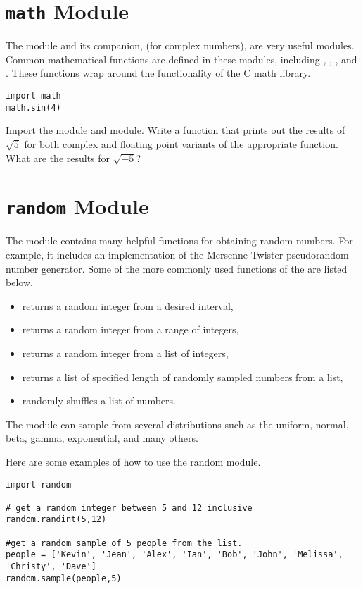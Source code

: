 \section*{\texttt{math} Module}
The  module and its companion,  (for complex numbers), are very useful modules.
Common mathematical functions are defined in these modules, including , , , and .
These functions wrap around the functionality of the C math library.
\begin{lstlisting}
import math
math.sin(4)
\end{lstlisting}

\begin{problem}
Import the  module and  module. Write a function that prints out the results of $\sqrt{5}$ for both complex and floating point variants of the appropriate function.  What are the results for $\sqrt{-5}$?
\end{problem}

\section*{\texttt{random} Module}
The  module contains many helpful functions for obtaining random numbers.
For example, it includes an implementation of the Mersenne Twister pseudorandom number generator.
Some of the more commonly used functions of the  are listed below.
\begin{itemize}
\item {} returns a random integer from a desired interval,
\item {} returns a random integer from a range of integers,
\item {} returns a random integer from a list of integers,
\item {} returns a list of specified length of randomly sampled numbers from a list,
\item {} randomly shuffles a list of numbers.
\end{itemize}
The  module can sample from several distributions such as the uniform, normal, beta, gamma, exponential, and many others.

Here are some examples of how to use the random module.
\begin{lstlisting}
import random

# get a random integer between 5 and 12 inclusive
random.randint(5,12)

#get a random sample of 5 people from the list. 
people = ['Kevin', 'Jean', 'Alex', 'Ian', 'Bob', 'John', 'Melissa', 'Christy', 'Dave']
random.sample(people,5)
\end{lstlisting}

